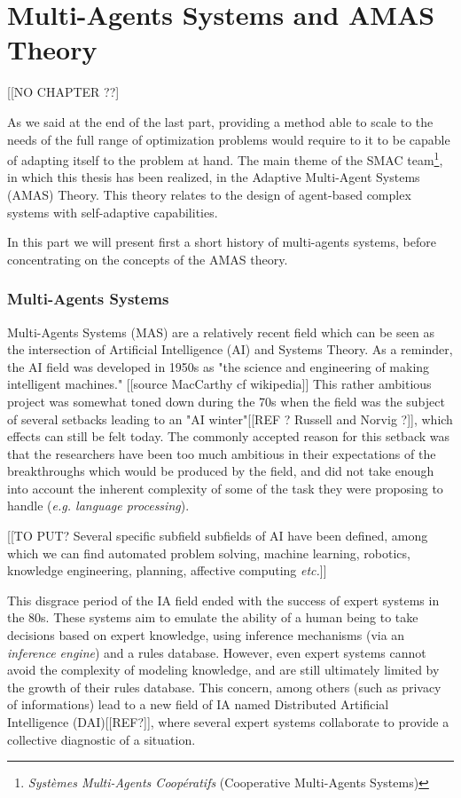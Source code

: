 \part{Multi-Agents Systems and AMAS Theory}

[[NO CHAPTER ??]

As we said at the end of the last part, providing a method able to scale to the needs of the full range of optimization problems would require to it to be capable of adapting itself to the problem at hand.
The main theme of the SMAC team\footnote{\emph{Systèmes Multi-Agents Coopératifs} (Cooperative Multi-Agents Systems)}, in which this thesis has been realized, in the Adaptive Multi-Agent Systems (AMAS) Theory. This theory relates to the design of agent-based complex systems with self-adaptive capabilities.

In this part we will present first a short history of multi-agents systems, before concentrating on the concepts of the AMAS theory.

\section{Multi-Agents Systems}

Multi-Agents Systems (MAS) are a relatively recent field which can be seen as the intersection of Artificial Intelligence (AI) and Systems Theory. As a reminder, the AI field was developed in 1950s as "the science and engineering of making intelligent machines." [[source MacCarthy cf wikipedia]] This rather ambitious project was somewhat toned down during the 70s when the field was the subject of several setbacks leading to an "AI winter"[[REF ? Russell and Norvig ?]], which effects can still be felt today. The commonly accepted reason for this setback was that the researchers have been too much ambitious in their expectations of the breakthroughs which would be produced by the field, and did not take enough into account the inherent complexity of some of the task they were proposing to handle (\emph{e.g. language processing}).

[[TO PUT? Several specific subfield subfields of AI have been defined, among which we can find automated problem solving, machine learning, robotics, knowledge engineering, planning, affective computing \emph{etc.}]]

This disgrace period of the IA field ended with the success of expert systems in the 80s. These systems aim to emulate the ability of a human being to take decisions based on expert knowledge, using inference mechanisms (via an \emph{inference engine}) and a rules database.
However, even expert systems cannot avoid the complexity of modeling knowledge, and are still ultimately limited by the growth of their rules database. This concern, among others (such as privacy of informations) lead to a new field of IA named Distributed Artificial Intelligence (DAI)[[REF?]], where several expert systems collaborate to provide a collective diagnostic of a situation.


